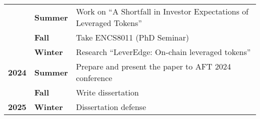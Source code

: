 \begin{table}[h]
{\begin{tabular}{|c|l|l|}
			& \textbf{Summer} & Work on ``A Shortfall in Investor Expectations of Leveraged Tokens'' \\ \cline{2-3} 
			& \textbf{Fall} & Take ENCS8011 (PhD Seminar) \\ \hline
			\multirow{3}{*}{\textbf{2024}} & \textbf{Winter} & Research ``LeverEdge: On-chain leveraged tokens'' \\ \cline{2-3} 
			& \textbf{Summer} & Prepare and present the paper to AFT 2024 conference \\ \cline{2-3} 
			& \textbf{Fall} & Write dissertation \\ \hline
			\textbf{2025} & \textbf{Winter} & Dissertation defense \\ \hline
		\end{tabular}%
	}
\end{table}

